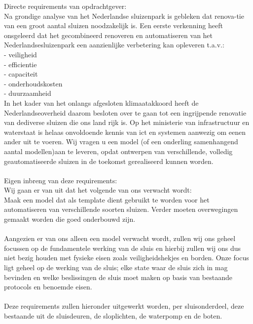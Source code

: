 Directe requirements van opdrachtgever:\\
Na grondige analyse van het Nederlandse sluizenpark is gebleken dat renova-tie van een groot aantal sluizen noodzakelijk is.  Een eerste verkenning heeft onsgeleerd dat het gecombineerd renoveren en automatiseren van het Nederlandsesluizenpark een aanzienlijke verbetering kan opleveren t.a.v.:\\
- veiligheid\\
- efficientie\\
- capaciteit\\
- onderhoudskosten\\
- duurzaamheid\\
In het kader van het onlangs afgesloten klimaatakkoord heeft de Nederlandseoverheid  daarom  besloten  over te gaan tot een ingrijpende renovatie van dediverse sluizen die ons land rijk is. Op het ministerie van infrastructuur en waterstaat is helaas onvoldoende kennis van ict en systemen aanwezig om eenen ander uit te voeren. Wij vragen u een model (of een onderling samenhangend aantal modellen)aan  te leveren, opdat ontwerpen van verschillende, volledig geautomatiseerde sluizen in de toekomst gerealiseerd kunnen worden.\\\\
Eigen inbreng van deze requirements:\\
Wij gaan er van uit dat het volgende van ons verwacht wordt:\\
Maak een model dat als template dient gebruikt te worden voor het automatiseren van verschillende soorten sluizen. Verder moeten overwegingen gemaakt worden die goed onderbouwd zijn.\\\\ Aangezien er van ons alleen een model verwacht wordt, zullen wij ons geheel focussen op de fundamentele werking van de sluis en hierbij zullen wij ons dus niet bezig  houden met fysieke eisen zoals veiligheidshekjes en borden. Onze focus ligt geheel op de werking van de sluis; elke state waar de sluis zich in mag bevinden en welke beslissingen de sluis moet maken op basis van bestaande protocols en benoemde eisen. \\\\
Deze requirements zullen hieronder uitgewerkt worden, per sluisonderdeel, deze bestaande uit de sluisdeuren, de sloplichten, de waterpomp en de boten.\\





